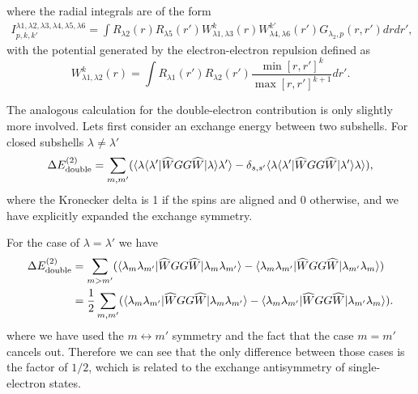 where the radial integrals are of the form
\begin{align}
    I^{\lambda1,\lambda2,\lambda3,\lambda4,\lambda5,\lambda6}_{p,k,k'} = \int R_{\lambda2}(r)R_{\lambda5}(r')W^k_{\lambda1,\lambda3}(r)W^{k'}_{\lambda4,\lambda6}(r') G_{\lambda_2,p}(r,r')dr dr',
\end{align}
with the potential generated by the electron-electron repulsion defined as
\begin{equation}
    W^k_{\lambda1,\lambda2}(r) = \int R_{\lambda1}(r')R_{\lambda2}(r') \frac{\min[r,r']^k}{\max[r,r']^{k+1}}dr'.
\end{equation}

The analogous calculation for the double-electron contribution is only slightly more involved. Lets first consider an exchange energy between two subshells. For closed subshells $\lambda \neq \lambda'$
\begin{equation}
    \Delta E^{(2)}_{\rm{double}} = \sum_{m,m'}(\langle \lambda \langle \lambda'|\widehat{W} GG \widehat{W}|\lambda \rangle \lambda'\rangle-\delta_{s,s'}\langle \lambda \langle \lambda'|\widehat{W} GG \widehat{W}|\lambda' \rangle \lambda \rangle),
\end{equation}
where the Kronecker delta is 1 if the spins are aligned and 0 otherwise, and we have explicitly expanded the exchange symmetry.

For the case of $\lambda=\lambda'$ we have
\begin{align}
    \Delta E^{(2)}_{\rm{double}} &= \sum_{m>m'}(\langle \lambda_m \lambda_{m'}|\widehat{W} GG \widehat{W}|\lambda_m \lambda_{m'}\rangle-\langle \lambda_{m} \lambda_{m'}|\widehat{W} GG \widehat{W}|\lambda_{m'} \lambda_{m} \rangle) \nonumber\\
    &= \frac{1}{2} \sum_{m,m'}(\langle \lambda_m \lambda_{m'}|\widehat{W} GG \widehat{W}|\lambda_m \lambda_{m'}\rangle-\langle \lambda_{m} \lambda_{m'}|\widehat{W} GG \widehat{W}|\lambda_{m'} \lambda_{m} \rangle).
\end{align}
where we have used the $m \leftrightarrow m'$ symmetry and the fact that the case $m=m'$ cancels out. Therefore we can see that the only difference between those cases is the factor of $1/2$, wchich is related to the exchange antisymmetry of single-electron states.

